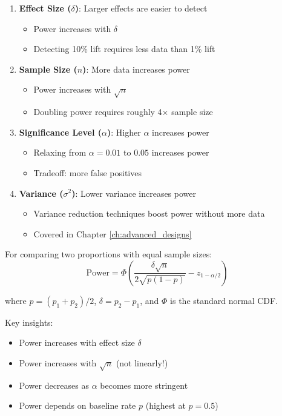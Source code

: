 \begin{enumerate}
    \item \textbf{Effect Size ($\delta$)}: Larger effects are easier to detect
    \begin{itemize}
        \item Power increases with $\delta$
        \item Detecting 10\% lift requires less data than 1\% lift
    \end{itemize}

    \item \textbf{Sample Size ($n$)}: More data increases power
    \begin{itemize}
        \item Power increases with $\sqrt{n}$
        \item Doubling power requires roughly 4× sample size
    \end{itemize}

    \item \textbf{Significance Level ($\alpha$)}: Higher $\alpha$ increases power
    \begin{itemize}
        \item Relaxing from $\alpha = 0.01$ to $0.05$ increases power
        \item Tradeoff: more false positives
    \end{itemize}

    \item \textbf{Variance ($\sigma^2$)}: Lower variance increases power
    \begin{itemize}
        \item Variance reduction techniques boost power without more data
        \item Covered in Chapter \ref{ch:advanced_designs}
    \end{itemize}
\end{enumerate}

\begin{theorem}
For comparing two proportions with equal sample sizes:
\begin{equation}
\text{Power} = \Phi\left(\frac{\delta\sqrt{n}}{2\sqrt{p(1-p)}} - z_{1-\alpha/2}\right)
\end{equation}

where $p = (p_1 + p_2)/2$, $\delta = p_2 - p_1$, and $\Phi$ is the standard normal CDF.

Key insights:
\begin{itemize}
    \item Power increases with effect size $\delta$
    \item Power increases with $\sqrt{n}$ (not linearly!)
    \item Power decreases as $\alpha$ becomes more stringent
    \item Power depends on baseline rate $p$ (highest at $p = 0.5$)
\end{itemize}
\end{theorem}

